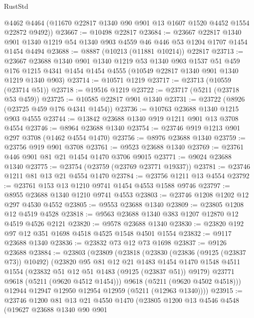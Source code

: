 \begin{lexlean}{RustStd}
\begin{coremodule}
      @4462
      @4464
      (@11670 @22817 @1340 @90 @901 @13 @1607 @1520 @4452 @1554 @22872 @9492))
@23667 := @10498 @22817
@23684 := @23667
    @22817
    @1340
    @901
    @1340
    @1219
    @54
    @1340
    @903
    @4559
    @46
    @446
    @53
    @1204
    @1707
    @1454
    @1454
    @4494
@23688 := @8887 (@10213 (@11881 @10214)) @22817
@23713 := @23667
    @23688
    @1340
    @901
    @1340
    @1219
    @53
    @1340
    @903
    @1537
    @51
    @459
    @176
    @1215
    @4341
    @1454
    @1454
    @4555
    (@10549 @22817 @1340 @901 @1340 @1219 @1340 @903)
@23714 := @10571 @1219
@23717 := @23713 (@10559 (@23714 @51))
@23718 := @19516 @1219
@23722 := @23717 (@5211 (@23718 @53 @459))
@23725 := @10585 @22817 @901 @1340
@23731 := @23722 (@8926 (@23725 @459 @176 @4341 @1454))
@23736 := @10763 @23688 @1340 @1215 @903 @4555
@23744 := @13842 @23688 @1340 @919 @1211 @901 @13 @3708 @4554
@23746 := @8964 @23688 @1340
@23754 := @23746 @919 @1213 @901 @297 @3708 (@1462 @4554 @1470)
@23756 := @8976 @23688 @1340
@23759 := @23756 @919 @901 @3708
@23761 := @9523 @23688 @1340
@23769 := @23761 @446 @901 @81 @21 @1454 @1470 @3706 @9015
@23771 := @9024 @23688 @1340
@23775 := @23754 (@23759 (@23769 @23771 @19337))
@23781 := @23746 @1211 @81 @13 @21 @4554 @1470
@23784 := @23756 @1211 @13 @4554
@23792 := @23761 @153 @13 @1210 @9741 @1454 @4553 @1588 @9746
@23797 := @8955 @23688 @1340 @1210 @9741 @4553
@23803 := @23746 @1208 @1202 @12 @297 @4530 @4552
@23805 := @9553 @23688 @1340
@23809 := @23805 @1208 @12 @4519 @4528
@23818 := @9563 @23688 @1340 @383 @1207 @12870 @12 @4519 @4526 @2121
@23820 := @9578 @23688 @1340
@23830 := @23820 @192 @97 @12 @351 @1698 @4518 @4525 @1548 @4501 @1554
@23832 := @9117 @23688 @1340
@23836 := @23832 @73 @12 @73 @1698
@23837 := @9126 @23688
@23884 := @23803
    (@23809
      (@23818
        (@23830
          (@23836 (@9125 (@23837 @73)) @10492)
          (@23820
            @95
            @81
            @12
            @21
            @1483
            @1454
            @1470
            @1548
            @4511
            @1554
            (@23832 @51 @12 @51 @1483 (@9125 (@23837 @51)) @9179)
            @23771
            @9618
            (@5211 (@9620 @4512 @1454)))
          @9618
          (@5211 (@9620 @4502 @4518)))
        @12944
        @12947
        @12950
        @12954
        @12959
        (@5211 (@12963 @1340))))
@23915 := @23746
    @1200
    @81
    @13
    @21
    @4550
    @1470
    (@23805
      @1200
      @13
      @4546
      @4548
      (@19627
        @23688
        @1340
        @90
        @901

\end{coremodule}
\end{lexlean}
